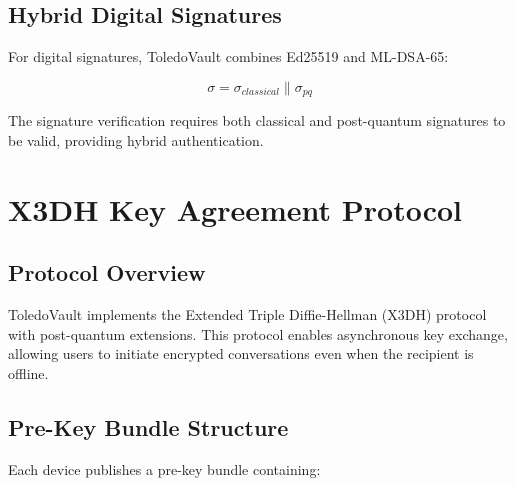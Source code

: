 \documentclass[12pt,a4paper]{article}
\begin{document}
\subsection{Hybrid Digital Signatures}

For digital signatures, ToledoVault combines Ed25519 and ML-DSA-65:

\begin{equation}
\sigma = \sigma_{classical} \| \sigma_{pq}
\end{equation}

The signature verification requires both classical and post-quantum signatures to be valid, providing hybrid authentication.

\section{X3DH Key Agreement Protocol}

\subsection{Protocol Overview}

ToledoVault implements the Extended Triple Diffie-Hellman (X3DH) protocol with post-quantum extensions. This protocol enables asynchronous key exchange, allowing users to initiate encrypted conversations even when the recipient is offline.

\subsection{Pre-Key Bundle Structure}

Each device publishes a pre-key bundle containing:
\end{document}
